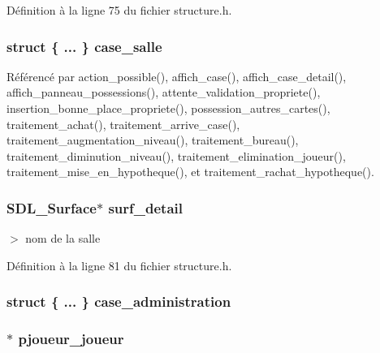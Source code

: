 D\'{e}finition \`{a} la ligne 75 du fichier structure.h.
\subsubsection{\setlength{\rightskip}{0pt plus 5cm}struct \{ ... \}  {\bf case\_\-salle}}\label{structcases_7eee361afdf3c3cde3a6c8368ef4fba5}




R\'{e}f\'{e}renc\'{e} par action\_\-possible(), affich\_\-case(), affich\_\-case\_\-detail(), affich\_\-panneau\_\-possessions(), attente\_\-validation\_\-propriete(), insertion\_\-bonne\_\-place\_\-propriete(), possession\_\-autres\_\-cartes(), traitement\_\-achat(), traitement\_\-arrive\_\-case(), traitement\_\-augmentation\_\-niveau(), traitement\_\-bureau(), traitement\_\-diminution\_\-niveau(), traitement\_\-elimination\_\-joueur(), traitement\_\-mise\_\-en\_\-hypotheque(), et traitement\_\-rachat\_\-hypotheque().
\subsubsection{\setlength{\rightskip}{0pt plus 5cm}SDL\_\-Surface$\ast$ {\bf surf\_\-detail}}\label{structcases_fe23bd51c8293f90f42d24e9cbd01578}


$>$ nom de la salle 



D\'{e}finition \`{a} la ligne 81 du fichier structure.h.
\subsubsection{\setlength{\rightskip}{0pt plus 5cm}struct \{ ... \}  {\bf case\_\-administration}}\label{structcases_9572e505f34cf0c1e09436e7beef7e14}


\subsubsection{$\ast$ {\bf pjoueur\_\-joueur}}\label{structcases_ba5ddcb460f45baa1ac6d5b25436dd73}


